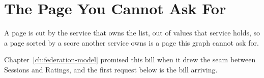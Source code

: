 \chapter{The Page You Cannot Ask For}
\label{ch:cross-seam-paging}

A page is cut by the service that owns the list, out of values that service
holds, so a page sorted by a score another service owns is a page this graph
cannot ask for.

Chapter~\ref{ch:federation-model} promised this bill when it drew the seam
between Sessions and Ratings, and the first request below is the bill
arriving.








